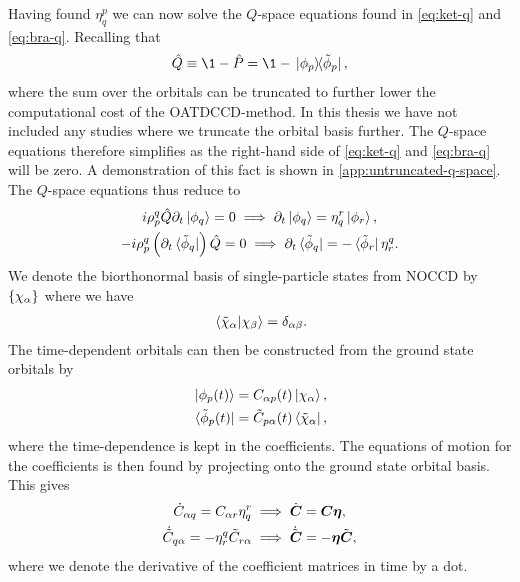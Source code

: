             Having found $\eta^{p}_{q}$ we can now solve the $Q$-space
            equations found in \autoref{eq:ket-q} and \autoref{eq:bra-q}.
            Recalling that
            \begin{align}
                \hat{Q} \equiv \1 - \hat{P}
                = \1 - \dyad*{\phi_p}{\tilde{\phi}_p},
            \end{align}
            where the sum over the orbitals can be truncated to further lower
            the computational cost of the OATDCCD-method.
            In this thesis we have not included any studies where we truncate
            the orbital basis further.
            The $Q$-space equations therefore simplifies as the right-hand side
            of \autoref{eq:ket-q} and \autoref{eq:bra-q} will be zero.
            A demonstration of this fact is shown in
            \autoref{app:untruncated-q-space}.
            The $Q$-space equations thus reduce to
            \begin{gather}
                i\rho^{q}_{p}\hat{Q}\partial_t\ket*{\phi_q} = 0
                \implies
                \partial_t\ket*{\phi_q}
                = \eta^{r}_{q}\ket*{\phi_r},
                \\
                -i\rho^{q}_{p}\left( 
                    \partial_t\bra*{\tilde{\phi}_q}
                 \right)\hat{Q}
                = 0
                \implies
                \partial_t\bra*{\tilde{\phi}_q}
                = -\bra*{\tilde{\phi}_r}\eta^{q}_{r}.
            \end{gather}
            We denote the biorthonormal basis of single-particle states from
            NOCCD by $\left\{ \chi_{\alpha} \right\}$ where we have
            \begin{align}
                \braket*{\tilde{\chi}_{\alpha}}{\chi_{\beta}}
                = \delta_{\alpha \beta}.
            \end{align}
            The time-dependent orbitals can then be constructed from the ground
            state orbitals by
            \begin{gather}
                \ket*{\phi_p(t)}
                = C_{\alpha p}(t) \ket*{\chi_{\alpha}},
                \\
                \bra*{\tilde{\phi}_p(t)}
                = \tilde{C}_{p \alpha}(t) \bra*{\tilde{\chi}_{\alpha}},
            \end{gather}
            where the time-dependence is kept in the coefficients.
            The equations of motion for the coefficients is then found by
            projecting onto the ground state orbital basis.
            This gives
            \begin{gather}
                \dot{C}_{\alpha q} = C_{\alpha r} \eta^{r}_{q}
                \implies
                \dot{\boldsymbol{C}} = \boldsymbol{C} \boldsymbol{\eta},
                \\
                \dot{\tilde{C}}_{q \alpha}
                = -\eta^{q}_{r} \tilde{C}_{r \alpha}
                \implies
                \dot{\tilde{\boldsymbol{C}}}
                = -\boldsymbol{\eta} \tilde{\boldsymbol{C}},
            \end{gather}
            where we denote the derivative of the coefficient matrices in time
            by a dot.

